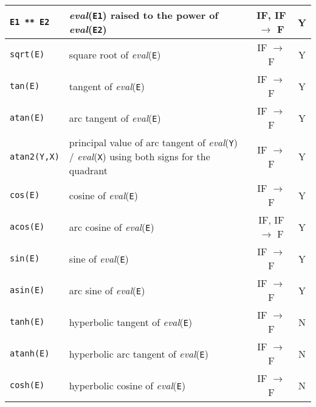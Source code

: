 \begin{supertabular}{|l|L{7.5cm}|c|c|}
\hline

\texttt{E1 ** E2} & \textit{eval}(\texttt{E1}) raised to the power of
\textit{eval}(\texttt{E2}) & IF, IF $\rightarrow$ F & Y \\

\hline

\texttt{sqrt(E)} & square root of \textit{eval}(\texttt{E}) & IF
$\rightarrow$ F & Y \\

\hline

\texttt{tan(E)} & tangent of \textit{eval}(\texttt{E}) & IF
$\rightarrow$ F & Y \\

\hline

\texttt{atan(E)} & arc tangent of \textit{eval}(\texttt{E}) & IF
$\rightarrow$ F & Y \\

\hline

\texttt{atan2(Y,X)} & principal value of arc tangent
of \textit{eval}(\texttt{Y}) / \textit{eval}(\texttt{X}) using both signs for the quadrant & IF
$\rightarrow$ F & Y \\

\hline

\texttt{cos(E)} & cosine of \textit{eval}(\texttt{E}) & IF $\rightarrow$ F &
Y \\

\hline

\texttt{acos(E)} & arc cosine of \textit{eval}(\texttt{E}) & IF, IF $\rightarrow$ F &
Y \\

\hline

\texttt{sin(E)} & sine of \textit{eval}(\texttt{E}) & IF $\rightarrow$ F & Y \\

\hline

\texttt{asin(E)} & arc sine of \textit{eval}(\texttt{E}) & IF $\rightarrow$ F & Y \\

\hline

\texttt{tanh(E)} & hyperbolic tangent of \textit{eval}(\texttt{E}) & IF
$\rightarrow$ F & N \\

\hline

\texttt{atanh(E)} & hyperbolic arc tangent of \textit{eval}(\texttt{E}) & IF
$\rightarrow$ F & N \\

\hline

\texttt{cosh(E)} & hyperbolic cosine of \textit{eval}(\texttt{E}) & IF $\rightarrow$ F & N \\


\end{supertabular}
